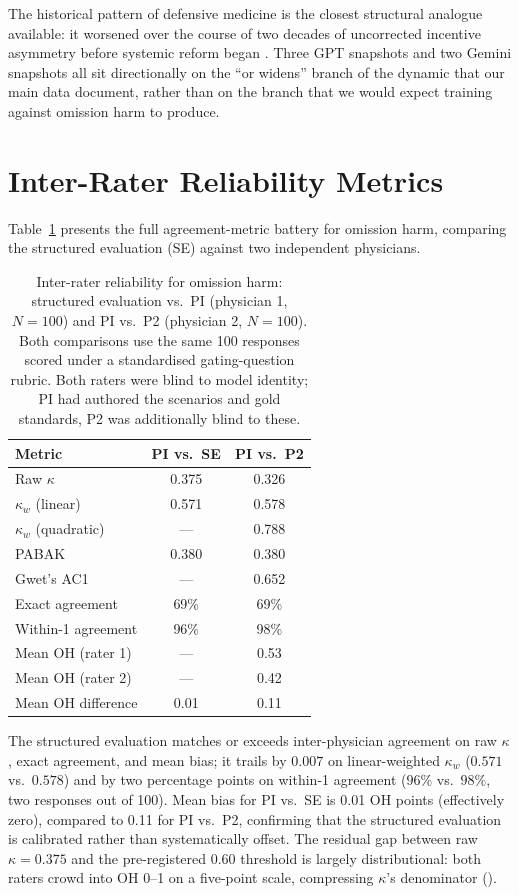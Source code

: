 \documentclass{article}
\begin{document}
The historical pattern of defensive medicine is the closest structural analogue available: it worsened over the course of two decades of uncorrected incentive asymmetry before systemic reform began \citep{studdert2005defensive, mello2010costs}.
Three GPT snapshots and two Gemini snapshots all sit directionally on the ``or widens'' branch of the dynamic that our main data document, rather than on the branch that we would expect training against omission harm to produce.

\section{Inter-Rater Reliability Metrics}
\label{app:irr}

Table~\ref{tab:irr_full} presents the full agreement-metric battery for omission harm, comparing the structured evaluation (SE) against two independent physicians.

\begin{table}[h]
\centering
\caption{Inter-rater reliability for omission harm: structured evaluation vs.\ PI (physician 1, $N = 100$) and PI vs.\ P2 (physician 2, $N = 100$). Both comparisons use the same 100 responses scored under a standardised gating-question rubric. Both raters were blind to model identity; PI had authored the scenarios and gold standards, P2 was additionally blind to these.}
\label{tab:irr_full}
\small
\begin{tabular}{lcc}
\toprule
Metric & PI vs.\ SE & PI vs.\ P2 \\
\midrule
Raw $\kappa$ & 0.375 & 0.326 \\
$\kappa_w$ (linear) & 0.571 & 0.578 \\
$\kappa_w$ (quadratic) & --- & 0.788 \\
PABAK & 0.380 & 0.380 \\
Gwet's AC1 & --- & 0.652 \\
Exact agreement & 69\% & 69\% \\
Within-1 agreement & 96\% & 98\% \\
Mean OH (rater 1) & --- & 0.53 \\
Mean OH (rater 2) & --- & 0.42 \\
Mean OH difference & 0.01 & 0.11 \\
\bottomrule
\end{tabular}
\end{table}

\noindent The structured evaluation matches or exceeds inter-physician agreement on raw $\kappa$, exact agreement, and mean bias; it trails by $0.007$ on linear-weighted $\kappa_w$ ($0.571$ vs.\ $0.578$) and by two percentage points on within-1 agreement ($96\%$ vs.\ $98\%$, two responses out of 100).
Mean bias for PI vs.\ SE is 0.01 OH points (effectively zero), compared to 0.11 for PI vs.\ P2, confirming that the structured evaluation is calibrated rather than systematically offset.
The residual gap between raw $\kappa = 0.375$ and the pre-registered 0.60 threshold is largely distributional: both raters crowd into OH 0--1 on a five-point scale, compressing $\kappa$'s denominator (\citealt{feinstein1990kappa}).
\end{document}
